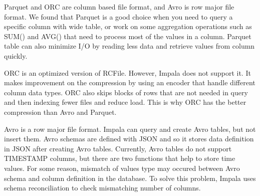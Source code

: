 \documentclass[onecolumn, draftclsnofoot,10pt, compsoc]{IEEEtran}
\begin{document}
Parquet and ORC are column based file format, and Avro is row major file format. We found that Parquet is a good choice when you need to query a specific column with wide table, or work on some aggregation operations such as SUM() and AVG() that need to process most of the values in a column. Parquet table can also minimize I/O by reading less data and retrieve values from column quickly.
 
ORC is an optimized version of RCFile. However, Impala does not support it. It makes improvement on the compression by using an encoder that handle different column data types. ORC also skips blocks of rows that are not needed in query and then indexing fewer files and reduce load. This is why ORC has the better compression than Avro and Parquet.
 
Avro is a row major file format. Impala can query and create Avro tables, but not insert them. Avro schemas are defined with JSON and so it stores data definition in JSON after creating Avro tables. Currently, Avro tables do not support TIMESTAMP columns, but there are two functions that help to store time values. For some reason, mismatch of values type may occured between Avro schema and column definition in the database. To solve this problem, Impala uses schema reconciliation to check mismatching number of columns.
\end{document}
